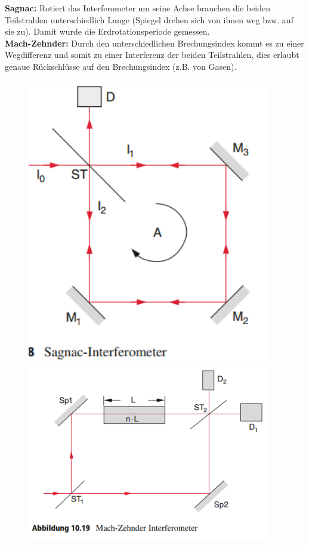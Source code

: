\documentclass[a4paper, 11pt, ngerman, parskip=half-]{scrartcl}
\begin{document}
    \textbf{Sagnac:} Rotiert das Interferometer um seine Achse brauchen die beiden Teilstrahlen unterschiedlich Lange (Spiegel drehen sich von ihnen weg bzw. auf sie zu).
    Damit wurde die Erdrotationsperiode gemessen.\\
    \textbf{Mach-Zehnder:} Durch den unterschiedlichen Brechungsindex kommt es zu einer Wegdifferenz und somit zu einer Interferenz der beiden Teilstrahlen, dies erlaubt genaue Rückschlüsse auf den
    Brechungsindex (z.B. von Gasen).
    \begin{figure}[H]
        \centering
        \begin{minipage}[b]{0.35\textwidth}
            \centering
            \includegraphics[width=0.95\textwidth]{image/18_Interferenz/Sagnac_Interferometer.png}
        \end{minipage}
        \hspace{2cm}
        \begin{minipage}[b]{0.5\textwidth}
            \centering
            \includegraphics[width=0.95\textwidth]{image/18_Interferenz/Mach-Zehnder_Interferometer.png}

\end{minipage}
\end{figure}
\end{document}
